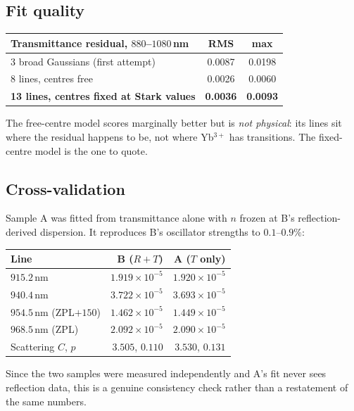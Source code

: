 \documentclass[11pt,a4paper]{article}
\begin{document}
\subsection{Fit quality}

\begin{center}\small
\begin{tabular}{@{}lcc@{}}
\toprule
Transmittance residual, $880$--$1080$\,nm & RMS & max \\
\midrule
3 broad Gaussians (first attempt) & 0.0087 & 0.0198\\
8 lines, centres free & 0.0026 & 0.0060\\
\textbf{13 lines, centres fixed at Stark values} & \textbf{0.0036} & \textbf{0.0093}\\
\bottomrule
\end{tabular}
\end{center}

The free-centre model scores marginally better but is \emph{not physical}: its
lines sit where the residual happens to be, not where Yb$^{3+}$ has transitions.
The fixed-centre model is the one to quote.

\subsection{Cross-validation}

Sample A was fitted from transmittance alone with $n$ frozen at B's
reflection-derived dispersion. It reproduces B's oscillator strengths to
$0.1$--$0.9\%$:

\begin{center}\small
\begin{tabular}{@{}lrr@{}}
\toprule
Line & B ($R+T$) & A ($T$ only)\\
\midrule
$915.2$\,nm & $1.919\times10^{-5}$ & $1.920\times10^{-5}$\\
$940.4$\,nm & $3.722\times10^{-5}$ & $3.693\times10^{-5}$\\
$954.5$\,nm (ZPL$+150$) & $1.462\times10^{-5}$ & $1.449\times10^{-5}$\\
$968.5$\,nm (ZPL) & $2.092\times10^{-5}$ & $2.090\times10^{-5}$\\
Scattering $C$, $p$ & $3.505$, $0.110$ & $3.530$, $0.131$\\
\bottomrule
\end{tabular}
\end{center}

Since the two samples were measured independently and A's fit never sees
reflection data, this is a genuine consistency check rather than a restatement
of the same numbers.
\end{document}
